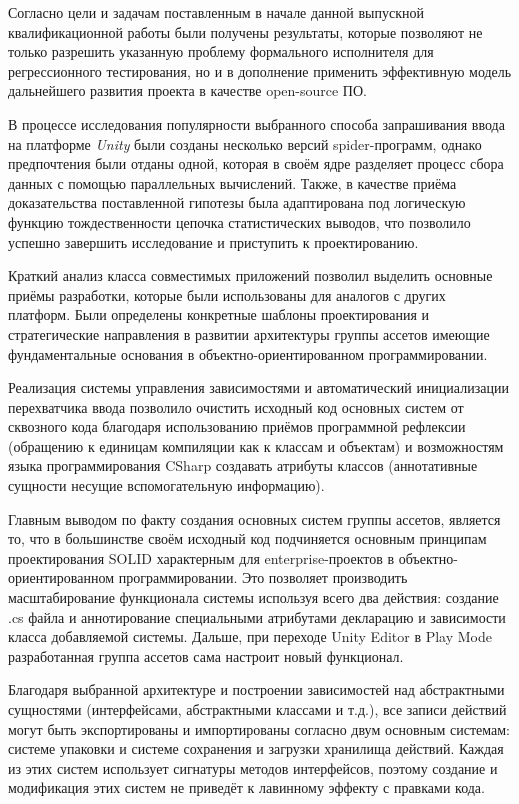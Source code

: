 \Conclusion
Согласно цели и задачам поставленным в начале данной выпускной квалификационной работы были получены результаты, которые позволяют не только разрешить указанную проблему формального исполнителя для регрессионного тестирования, но и в дополнение применить эффективную \cite{open_source} модель дальнейшего развития проекта в качестве open-source ПО.

В процессе исследования популярности выбранного способа запрашивания ввода на платформе \textit{Unity} были созданы несколько версий spider-программ, однако предпочтения были отданы одной, которая в своём ядре разделяет процесс сбора данных с помощью параллельных вычислений. Также, в качестве приёма доказательства поставленной гипотезы была адаптирована под логическую функцию тождественности цепочка статистических выводов, что позволило успешно завершить исследование и приступить к проектированию.

Краткий анализ класса совместимых приложений позволил выделить основные приёмы разработки, которые были использованы для аналогов с других платформ. Были определены конкретные шаблоны проектирования и стратегические направления в развитии архитектуры группы ассетов имеющие фундаментальные основания в объектно-ориентированном программировании.

Реализация системы управления зависимостями и автоматический инициализации перехватчика ввода позволило очистить исходный код основных систем от сквозного кода благодаря использованию приёмов программной рефлексии (обращению к единицам компиляции как к классам и объектам) и возможностям языка программирования CSharp создавать атрибуты классов (аннотативные сущности несущие вспомогательную информацию).

Главным выводом по факту создания основных систем группы ассетов, является то, что в большинстве своём исходный код подчиняется основным принципам проектирования SOLID характерным для enterprise-проектов в объектно-ориентированном программировании. Это позволяет производить масштабирование функционала системы используя всего два действия: создание .cs файла и аннотирование специальными атрибутами декларацию и зависимости класса добавляемой системы. Дальше, при переходе Unity Editor в Play Mode разработанная группа ассетов сама настроит новый функционал.

Благодаря выбранной архитектуре и построении зависимостей над абстрактными сущностями (интерфейсами, абстрактными классами и т.д.), все записи действий могут быть экспортированы и импортированы согласно двум основным системам: системе упаковки и системе сохранения и загрузки хранилища действий. Каждая из этих систем использует сигнатуры методов интерфейсов, поэтому создание и модификация этих систем не приведёт к лавинному эффекту с правками кода.

